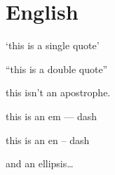 
\def\mytitle{MultiMarkdown English Test}


\part{English}
\label{english}

`this is a single quote'

``this is a double quote''

this isn't an apostrophe.

this is an em --- dash

this is an en -- dash

and an ellipsis{\ldots}




